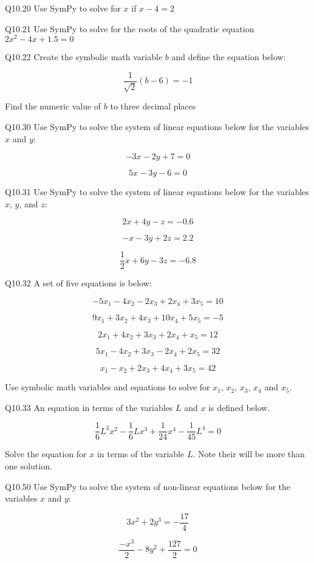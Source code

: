 \documentclass{book}
\newenvironment{problems}{}{}  %
\begin{document}
    
        \begin{problems}
        Q10.20 Use SymPy to solve for \(x\) if \(x - 4 = 2\)

Q10.21 Use SymPy to solve for the roots of the quadratic equation
\(2x^2 - 4x + 1.5 = 0\)

Q10.22 Create the symbolic math variable \(b\) and define the equation
below:

\[ \frac{1}{\sqrt{2}}(b - 6) = -1 \]

Find the numeric value of \(b\) to three decimal places

Q10.30 Use SymPy to solve the system of linear equations below for the
variables \(x\) and \(y\):

\[ -3x - 2y + 7  = 0 \]

\[ 5x - 3y - 6 = 0 \]

Q10.31 Use SymPy to solve the system of linear equations below for the
variables \(x\), \(y\), and \(z\):

\[ 2x + 4y - z = -0.6 \]

\[ -x - 3y + 2z = 2.2 \]

\[ \frac{1}{2}x + 6y - 3z = -6.8 \]

Q10.32 A set of five equations is below:

\[ -5x_1 - 4x_2 - 2x_3 + 2x_4 + 3x_5 = 10 \]

\[ 9x_1 + 3x_2 + 4x_3 + 10x_4 + 5x_5 = -5 \]

\[ 2x_1 + 4x_2 + 3x_3 + 2x_4 + x_5 = 12 \]

\[ 5x_1 - 4x_2 + 3x_3 - 2x_4 + 2x_5 = 32 \]

\[ x_1 - x_2 + 2x_3 + 4x_4 + 3x_5 = 42 \]

Use symbolic math variables and equations to solve for \(x_1\), \(x_2\),
\(x_3\), \(x_4\) and \(x_5\).

Q10.33 An equation in terms of the variables \(L\) and \(x\) is defined
below.

\[ \frac{1}{6}L^3x^2 - \frac{1}{6}Lx^3 + \frac{1}{24}x^4 - \frac{1}{45}L^4 = 0 \]

Solve the equation for \(x\) in terms of the variable \(L\). Note their
will be more than one solution.

Q10.50 Use SymPy to solve the system of non-linear equations below for
the variables \(x\) and \(y\):

\[ 3x^2 + 2y^3 = -\frac{17}{4} \]

\[ \frac{-x^3}{2} - 8y^2 + \frac{127}{2} = 0 \]
        \end{problems}
\end{document}
